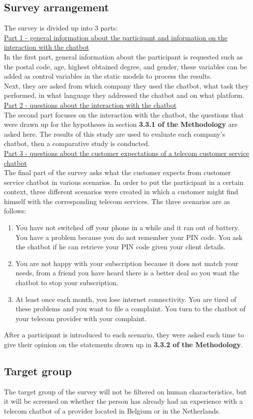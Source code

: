 \subsection{Survey arrangement}
The survey is divided up into 3 parts:\\
\break
\ul{Part 1 - general information about the participant and information on the interaction with the chatbot}\\
\break
In the first part, general information about the participant is requested such as the postal code, age, highest obtained degree, and gender, these variables can be added as control variables in the static models to process the results.\\
\break
Next, they are asked from which company they used the chatbot, what task they performed, in what language they addressed the chatbot and on what platform.\\
\break
\ul{Part 2 - questions about the interaction with the chatbot}\\
\break
The second part focuses on the interaction with the chatbot, the questions that were drawn up for the hypotheses in section \textbf{3.3.1 of the Methodology} are asked here. The results of this study are used to evaluate each company's chatbot, then a comparative study is conducted.\\
\break
\ul{Part 3 - questions about the customer expectations of a telecom customer service chatbot}\\
\break
The final part of the survey asks what the customer expects from customer service chatbot in various scenarios. In order to put the participant in a certain context, three different scenarios were created in which a customer might find himself with the corresponding telecom services. The three scenarios are as follows:
\begin{enumerate}
	\item You have not switched off your phone in a while and it  ran out of battery. You have a problem because you do not remember your PIN code. You ask the chatbot if he can retrieve your PIN code given your client details. 
	\item You are not happy with your subscription because it does not match your needs, from a friend you have heard there is a better deal so you want the chatbot to stop your subscription.
	\item At least once each month, you lose internet connectivity. You are tired of these problems and you want to file a complaint. You turn to the chatbot of your telecom provider with your complaint.
\end{enumerate}
After a participant is introduced to each scenario, they were asked each time to give their opinion on the statements drawn up in \textbf{3.3.2 of the Methodology}.

\subsection{Target group}
The target group of the survey will not be filtered on human characteristics, but it will be screened on whether the person has already had an experience with a telecom chatbot of a provider located in Belgium or in the Netherlands.
